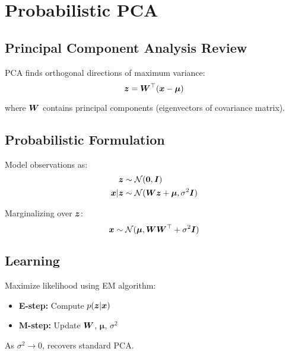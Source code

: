 
\section{Probabilistic PCA}
\label{sec:prob-pca}

\subsection{Principal Component Analysis Review}

PCA finds orthogonal directions of maximum variance:
\begin{equation}
\boldsymbol{z} = \boldsymbol{W}^\top (\boldsymbol{x} - \boldsymbol{\mu})
\end{equation}

where $\boldsymbol{W}$ contains principal components (eigenvectors of covariance matrix).

\subsection{Probabilistic Formulation}

Model observations as:
\begin{align}
\boldsymbol{z} &\sim \mathcal{N}(\boldsymbol{0}, \boldsymbol{I}) \\
\boldsymbol{x} | \boldsymbol{z} &\sim \mathcal{N}(\boldsymbol{W}\boldsymbol{z} + \boldsymbol{\mu}, \sigma^2 \boldsymbol{I})
\end{align}

Marginalizing over $\boldsymbol{z}$:
\begin{equation}
\boldsymbol{x} \sim \mathcal{N}(\boldsymbol{\mu}, \boldsymbol{W}\boldsymbol{W}^\top + \sigma^2 \boldsymbol{I})
\end{equation}

\subsection{Learning}

Maximize likelihood using EM algorithm:
\begin{itemize}
    \item \textbf{E-step:} Compute $p(\boldsymbol{z}|\boldsymbol{x})$
    \item \textbf{M-step:} Update $\boldsymbol{W}$, $\boldsymbol{\mu}$, $\sigma^2$
\end{itemize}

As $\sigma^2 \to 0$, recovers standard PCA.

